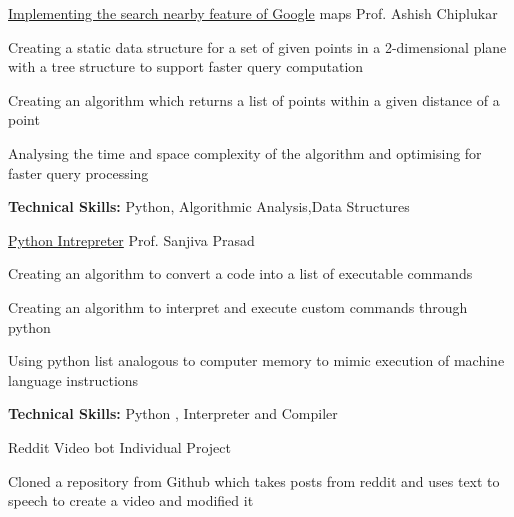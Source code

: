 \begin{cventries}
{\begin{cvitems}
      \end{cvitems}
    }
    \vspace{3mm}
    \cventry
    {} %
    {\href{https://github.com/AnshikSahu/COL106}{Implementing the search nearby feature of Google} maps} %
    {Prof. Ashish Chiplukar} %
    {} %
    {
    \vspace{-3mm}
      \begin{cvitems} %
        \item {Creating a static data structure for a set of given points in a 2-dimensional plane with a tree structure to support faster query computation}
        \item {Creating an algorithm which returns a list of points within a given distance of a point}
        \item {Analysing the time and space complexity of the algorithm and optimising for faster query processing}
        \item {\textbf{Technical Skills:} Python, Algorithmic Analysis,Data Structures}
      \end{cvitems}
    }
    \vspace{3mm}
    \cventry
    {} %
    {\href{https://github.com/AnshikSahu/COL100/blob/main/2021CS10577_assignment_5_2.py}{Python Intrepreter}} %
    {Prof. Sanjiva Prasad} %
    {} %
    {
    \vspace{-3mm}
      \begin{cvitems} %
        \item {Creating an algorithm to convert a code into a list of executable commands}
        \item {Creating an algorithm to interpret and execute custom commands through python }
        \item {Using python list analogous to computer memory to mimic execution of machine language instructions}
        \item {\textbf{Technical Skills:} Python , Interpreter and Compiler}
      \end{cvitems}
    }
    \vspace{3mm}
    \cventry
    {} %
    {Reddit Video bot} %
    {Individual Project} %
    {} %
    {
    \vspace{-3mm}
      \begin{cvitems} %
        \item {Cloned a repository from Github which takes posts from reddit and uses text to speech to create a video and modified it}

\end{cvitems}}
\end{cventries}
